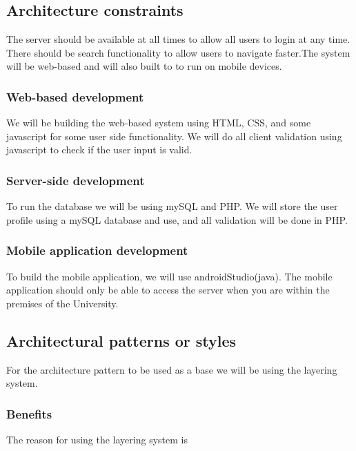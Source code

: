 \documentclass[a4paper,12pt]{report}
\begin{document}
\subsection{Architecture constraints}

The server should be available at all times to allow all users to login at any time. There should be search functionality to allow users to navigate faster.The system will be web-based and will also built to to run on mobile devices.

\subsubsection{Web-based development}

We will be building the web-based system using HTML, CSS, and some javascript for some user side functionality. We will do all client validation using javascript to check if the user input is valid.  

\subsubsection{Server-side development}

To run the database we will be using mySQL and PHP. We will store the user profile using a mySQL database and use, and all validation will be done in PHP.


\subsubsection{Mobile application development}

To build the mobile application, we will use androidStudio(java). The mobile application should only be able to access the server when you are within the premises of the University.

\subsection{Architectural patterns or styles}
For the architecture pattern to be used as a base we will be using the layering system.

\subsubsection{Benefits}
The reason for using the layering system is
\end{document}
